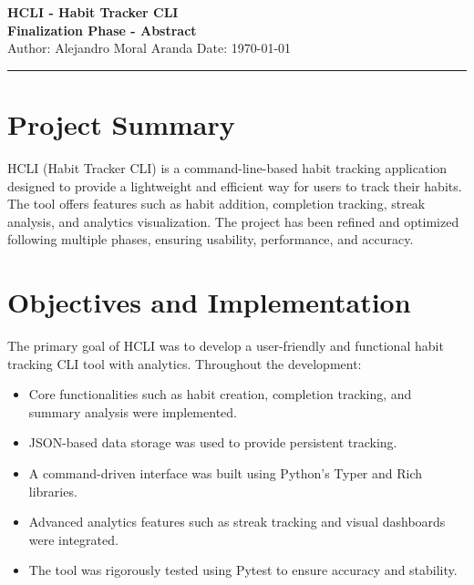 \documentclass[a4paper,12pt]{article}
\begin{document}
\begin{center}
    {\LARGE \textbf{HCLI - Habit Tracker CLI}}\\[0.5cm]
    {\Large \textbf{Finalization Phase - Abstract}}\\[0.3cm]
    {\small Author: Alejandro Moral Aranda \hspace{1cm} Date: \today}
    \hrule
\end{center}

\section{Project Summary}
HCLI (Habit Tracker CLI) is a command-line-based habit tracking application designed to provide a lightweight and efficient way for users to track their habits. The tool offers features such as habit addition, completion tracking, streak analysis, and analytics visualization. The project has been refined and optimized following multiple phases, ensuring usability, performance, and accuracy.

\section{Objectives and Implementation}
The primary goal of HCLI was to develop a user-friendly and functional habit tracking CLI tool with analytics. Throughout the development:
\begin{itemize}
    \item Core functionalities such as habit creation, completion tracking, and summary analysis were implemented.
    \item JSON-based data storage was used to provide persistent tracking.
    \item A command-driven interface was built using Python’s Typer and Rich libraries.
    \item Advanced analytics features such as streak tracking and visual dashboards were integrated.
    \item The tool was rigorously tested using Pytest to ensure accuracy and stability.
\end{itemize}

\end{document}
